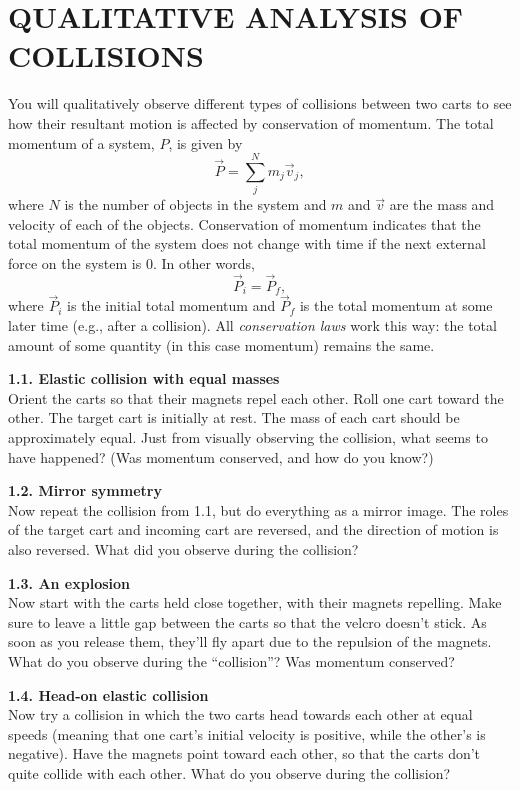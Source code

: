 \documentclass[11pt,letterpaper]{article}
\begin{document}
\section{QUALITATIVE ANALYSIS OF COLLISIONS}
You will qualitatively observe different types of collisions between two carts to see how their resultant motion is affected by conservation of momentum. The total momentum of a system, $P$, is given by
$$\vec P=\displaystyle\sum_j^N{m_j\vec v_j},$$
where $N$ is the number of objects in the system and $m$ and $\vec v$ are the mass and velocity of each of the objects. Conservation of momentum indicates that the total momentum of the system does not change with time if the next external force on the system is 0. In other words, 
$$\vec P_i = \vec P_f,$$
where $\vec P_i$ is the initial total momentum and $\vec P_f$ is the total momentum at some later time (e.g., after a collision). %
All \textit{conservation laws} work this way: the total amount of some quantity (in this case momentum) remains the same.


{\bf 1.1. Elastic collision with equal masses}\\ 
Orient the carts so that their magnets repel each other. Roll one cart toward the other. The target cart is initially at rest. The mass of each cart should be approximately equal. Just from visually observing the collision, what seems to have happened? (Was momentum conserved, and how do you know?)

{\bf 1.2. Mirror symmetry}\\
Now repeat the collision from 1.1, but do everything as a mirror image.  The roles of the target cart and incoming cart are reversed, and the direction of motion is also reversed.  What did you observe during the collision?  

{\bf 1.3. An explosion}\\
Now start with the carts held close together, with their magnets repelling. Make sure to leave a little gap between the carts so that the velcro doesn't stick. As soon as you release them, they'll fly apart due to the repulsion of the magnets.  What do you observe during the ``collision''? Was momentum conserved?

{\bf 1.4. Head-on elastic collision}\\
Now try a collision in which the two carts head towards each other at equal speeds (meaning that one cart's initial velocity is positive, while the other's is negative). Have the magnets point toward each other, so that the carts don't quite collide with each other. What do
you observe during the collision?
\end{document}
